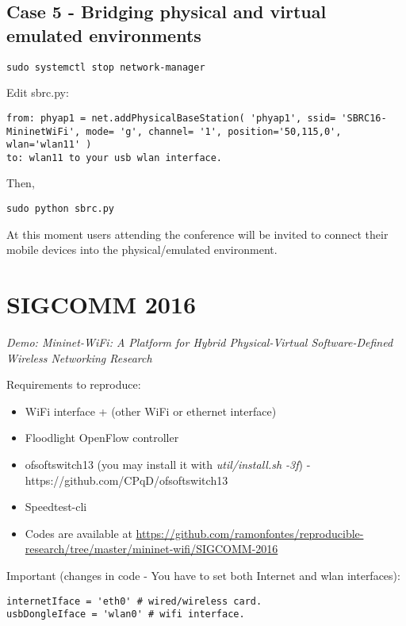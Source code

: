 \subsection{Case 5 - Bridging physical and virtual emulated environments}

\begin{verbatim}
sudo systemctl stop network-manager
\end{verbatim}

Edit sbrc.py:

\begin{verbatim}
from: phyap1 = net.addPhysicalBaseStation( 'phyap1', ssid= 'SBRC16-MininetWiFi', mode= 'g', channel= '1', position='50,115,0', wlan='wlan11' )  
to: wlan11 to your usb wlan interface.
\end{verbatim}

Then,

\begin{verbatim}
sudo python sbrc.py
\end{verbatim}

At this moment users attending the conference will be invited to connect their mobile devices into the physical/emulated environment.

\section{SIGCOMM 2016}{\label{sec:sigcomm2016}}
\textit{Demo: Mininet-WiFi: A Platform for Hybrid Physical-Virtual Software-Defined Wireless Networking Research}

Requirements to reproduce:
\begin{itemize}
\item WiFi interface + (other WiFi or ethernet interface)
\item Floodlight OpenFlow controller
\item ofsoftswitch13 (you may install it with \textit{util/install.sh -3f}) - https://github.com/CPqD/ofsoftswitch13
\item Speedtest-cli
\item Codes are available at \url{https://github.com/ramonfontes/reproducible-research/tree/master/mininet-wifi/SIGCOMM-2016}
\end{itemize}

Important (changes in code - You have to set both Internet and wlan interfaces):
\begin{verbatim}
internetIface = 'eth0' # wired/wireless card.
usbDongleIface = 'wlan0' # wifi interface.
\end{verbatim}

